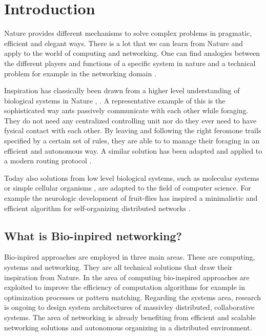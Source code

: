 \documentclass{IWORK2014}
\begin{document}


\section{Introduction}

Nature provides different mechanisms to solve complex problems in pragmatic, efficient and elegant ways. There is a lot that we can learn from Nature and apply to the world of computing and networking. One can find analogies between the different players and functions of a specific system in nature and a technical problem for example in the networking domain \cite{dressler2010bio}.

Inspiration has classically been drawn from a higher level understanding of biological systems in Nature \cite{kroeker2011biology}, \cite{liu2012physarum}. A representative example of this is the sophisticated way ants passively communicate with each other while foraging. They do not need any centralized controlling unit nor do they ever need to have fysical contact with each other. By leaving and following the right feromone trails specified by a certain set of rules, they are able to to manage their foraging in an efficient and autonomous way. A similar solution has been adapted and applied to a modern routing protocol \cite{dressler2010bio}.

Today also solutions from low level biological systems, such as molecular systems \cite{kroeker2011biology} or simple cellular organisms \cite{liu2012physarum}, are adapted to the field of computer science. For example the neurologic development of fruit-flies has inspired a minimalistic and efficient algorithm for self-organizing distributed networks \cite{kroeker2011biology}.

\subsection{What is Bio-inpired networking?}
Bio-inpired approaches are employed in three main areas. These are computing, systems and networking. They are all technical solutions that draw their inspiration from Nature. In the area of computing bio-inspired approaches are exploited to improve the efficiency of computation algorithms for example in optimization processes or pattern matching. Regarding the systems area, research is ongoing to design system architectures of massivley distributed, collaborative systems. The area of networking is already benefiting from efficient and scalable networking solutions and autonomous organizing in a distributed environment. \cite{dressler2010bio}
\end{document}

